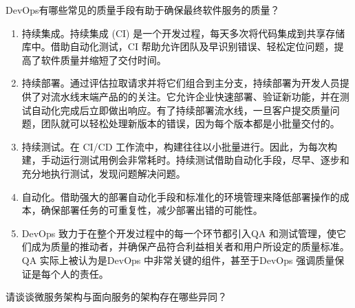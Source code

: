 \begin{problem}
DevOps有哪些常见的质量手段有助于确保最终软件服务的质量？
\end{problem}

\begin{solution}
\begin{enumerate}[label=\arabic*.]
    \item 持续集成。持续集成 (CI) 是一个开发过程，每天多次将代码集成到共享存储库中。借助自动化测试，CI 帮助允许团队及早识别错误、轻松定位问题，提高了软件质量并缩短了交付时间。
    \item 持续部署。通过评估拉取请求并将它们组合到主分支，持续部署为开发人员提供了对流水线末端产品的的关注。它允许企业快速部署、验证新功能，并在测试自动化完成后立即做出响应。有了持续部署流水线，一旦客户提交质量问题，团队就可以轻松处理新版本的错误，因为每个版本都是小批量交付的。
    \item 持续测试。在 CI/CD 工作流中，构建往往以小批量进行。因此，为每次构建，手动运行测试用例会非常耗时。持续测试借助自动化手段，尽早、逐步和充分地执行测试，发现问题解决问题。
    \item 自动化。借助强大的部署自动化手段和标准化的环境管理来降低部署操作的成本，确保部署任务的可重复性，减少部署出错的可能性。
    \item DevOps 致力于在整个开发过程中的每一个环节都引入QA 和测试管理，使它们成为质量的推动者，并确保产品符合利益相关者和用户所设定的质量标准。QA 实际上被认为是DevOps 中非常关键的组件，甚至于DevOps 强调质量保证是每个人的责任。
\end{enumerate}
\end{solution}



\begin{problem}
请谈谈微服务架构与面向服务的架构存在哪些异同？
\end{problem}

